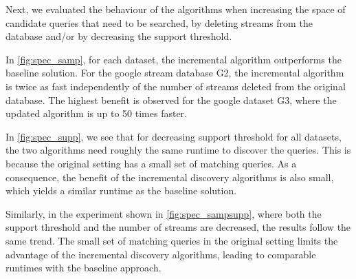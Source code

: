 Next, we evaluated the behaviour of the algorithms when increasing the space
of candidate queries that need to be searched, by deleting streams from the
database and/or by decreasing the support threshold.

In \autoref{fig:spec_samp}, for each dataset, the
incremental
algorithm outperforms the baseline solution. For the google stream database
G2, the
incremental algorithm is twice as fast independently of the number of
streams deleted
from the original database. The highest benefit is observed for the google
dataset G3,  where the updated algorithm is up to 50 times faster.

In \autoref{fig:spec_supp}, we see that for decreasing support threshold for
all datasets, the two algorithms need roughly the same
runtime to discover the queries.
This is because the original setting has a small set of matching queries. As
a consequence, the benefit of the incremental discovery algorithms is also
small, which yields a similar runtime as the baseline
solution.

Similarly, in the experiment shown in \autoref{fig:spec_sampsupp},
where both the support threshold and the number of streams are decreased,
the results follow the same trend. The small set of matching queries in the original
setting limits the advantage of the incremental discovery algorithms, leading to comparable
runtimes with the baseline approach.


